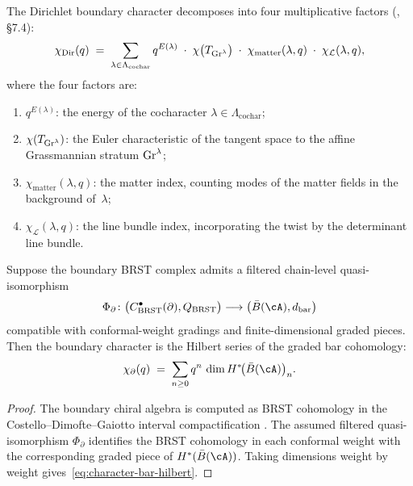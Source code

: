 \begin{proposition}
\label{prop:dirichlet-character-genus}
The Dirichlet boundary character decomposes into four multiplicative
factors \textup{(}\!\cite{CDG20}, \S7.4\textup{)}:
\begin{equation}\label{eq:dirichlet-character-genus}
\chi_{\mathrm{Dir}}(q)
\;=\;
\sum_{\lambda \in \Lambda_{\mathrm{cochar}}}
q^{E(\lambda)}
\;\cdot\;
\chi\bigl(T_{\operatorname{Gr}^\lambda}\bigr)
\;\cdot\;
\chi_{\mathrm{matter}}(\lambda,q)
\;\cdot\;
\chi_{\mathcal{L}}(\lambda,q),
\end{equation}
where the four factors are:
\begin{enumerate}[label=\textup{(\roman*)}]
\item $q^{E(\lambda)}$: the energy of the cocharacter
 $\lambda \in \Lambda_{\mathrm{cochar}}$;
\item $\chi(T_{\operatorname{Gr}^\lambda})$: the Euler characteristic of the tangent
 space to the affine Grassmannian stratum $\operatorname{Gr}^\lambda$;
\item $\chi_{\mathrm{matter}}(\lambda,q)$: the matter index, counting
 modes of the matter fields in the background of~$\lambda$;
\item $\chi_{\mathcal{L}}(\lambda,q)$: the line bundle index, incorporating
 the twist by the determinant line bundle.
\end{enumerate}
\end{proposition}

\begin{proposition}
\label{thm:boundary-characters-bar-hilbert}
Suppose the boundary BRST complex admits a filtered chain-level
quasi-isomorphism
\[
\Phi_\partial\colon
\bigl(C^\bullet_{\mathrm{BRST}}(\partial),Q_{\mathrm{BRST}}\bigr)
\longrightarrow
\bigl(\bar{B}(\cA),d_{\mathrm{bar}}\bigr)
\]
compatible with conformal-weight gradings and finite-dimensional
graded pieces. Then the boundary character is the Hilbert series of
the graded bar cohomology:
\begin{equation}\label{eq:character-bar-hilbert}
\chi_{\partial}(q)
\;=\;
\sum_{n \geq 0} q^n\,\dim H^*\!\bigl(\bar{B}(\cA)\bigr)_n.
\end{equation}
\end{proposition}

\begin{proof}
The boundary chiral algebra is computed as BRST cohomology in the
Costello--Dimofte--Gaiotto interval compactification \cite{CDG20}.
The assumed filtered quasi-isomorphism $\Phi_\partial$ identifies the
BRST cohomology in each conformal weight with the corresponding
graded piece of $H^*(\bar{B}(\cA))$. Taking dimensions weight by
weight gives~\eqref{eq:character-bar-hilbert}.
\end{proof}

